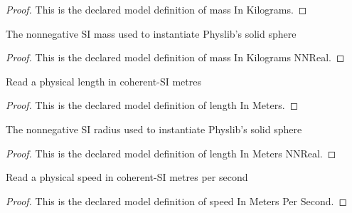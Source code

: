 \begin{proof}
  This is the declared model definition of mass In Kilograms.
\end{proof}
\begin{definition}
  \label{def:physics:phyx-mini-0788:phyxminiproblems-problemphyxmini0788-massinkilogramsnnreal}
  The nonnegative SI mass used to instantiate Physlib's solid sphere
\end{definition}
\begin{proof}
  This is the declared model definition of mass In Kilograms NNReal.
\end{proof}
\begin{definition}
  \label{def:physics:phyx-mini-0788:phyxminiproblems-problemphyxmini0788-lengthinmeters}
  Read a physical length in coherent-SI metres
\end{definition}
\begin{proof}
  This is the declared model definition of length In Meters.
\end{proof}
\begin{definition}
  \label{def:physics:phyx-mini-0788:phyxminiproblems-problemphyxmini0788-lengthinmetersnnreal}
  The nonnegative SI radius used to instantiate Physlib's solid sphere
\end{definition}
\begin{proof}
  This is the declared model definition of length In Meters NNReal.
\end{proof}
\begin{definition}
  \label{def:physics:phyx-mini-0788:phyxminiproblems-problemphyxmini0788-speedinmeterspersecond}
  Read a physical speed in coherent-SI metres per second
\end{definition}
\begin{proof}
  This is the declared model definition of speed In Meters Per Second.
\end{proof}
